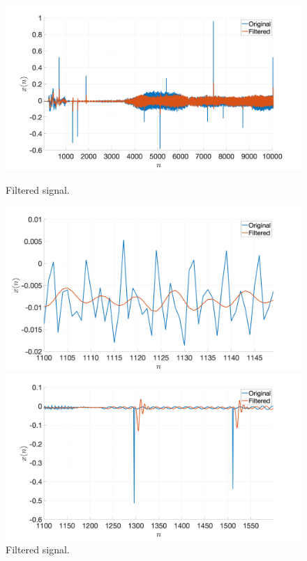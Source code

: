 \documentclass[]{scrartcl}
\begin{document}
\begin{figure}[htbp]
	\centering
	\begin{minipage}[b]{.49\textwidth}
		\centering
		\includegraphics[width= 1.1\textwidth]{figures/R2f_zoomOut.png}
		\caption{Filtered signal.}
		\label{fig:Rfc}
	\end{minipage}
	\hfill
	\begin{minipage}[b]{.49\textwidth}
		\centering
		\includegraphics[width= 1.1\textwidth]{figures/R2f_smallAmp.png}
		\caption{Filtered signal.}
		\label{fig:R2f_smallAmp}
	\end{minipage}
	\begin{minipage}[b]{.49\textwidth}
		\centering
		\includegraphics[width= 1.1\textwidth]{figures/R2f_zoomNoise.png}

\end{minipage}
\end{figure}
\end{document}
